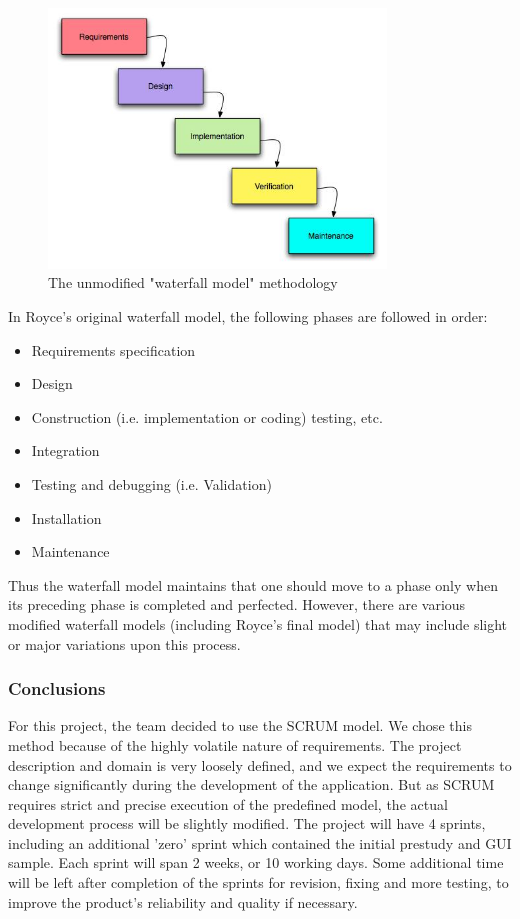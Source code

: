 \begin{figure}[htb]
	\centering
	\includegraphics[width=0.8\textwidth]{prestudy/development_process/waterfall.jpg}
	\caption{The unmodified "waterfall model" methodology\cite{worldpress:waterfall}}
	\label{fig:waterfall-model}
\end{figure}

In Royce's original waterfall model, the following phases are followed in order:

\begin{itemize}
	\item Requirements specification
	\item Design
	\item Construction (i.e. implementation or coding) testing, etc.
	\item Integration
	\item Testing and debugging (i.e. Validation)
	\item Installation
	\item Maintenance
\end{itemize}

Thus the waterfall model maintains that one should move to a phase only when its preceding phase is
completed and perfected\cite{waterfallmodel}. However, there are various modified waterfall models (including Royce's final model)
that may include slight or major variations upon this process.

\subsubsection{Conclusions}
For this project, the team decided to use the SCRUM model. We chose this method because of the highly volatile nature
of requirements. The project description and domain is very loosely defined,
and we expect the requirements to change significantly during the development
of the application. But as SCRUM requires strict and precise
execution of the predefined model, the actual development process will be slightly modified.
The project will have 4 sprints, including an additional 'zero' sprint which contained the initial
prestudy and GUI sample. Each sprint will span 2 weeks, or 10 working days.
Some additional time will be left after completion of the sprints for revision,
fixing and more testing, to improve the product's reliability and quality if necessary.

